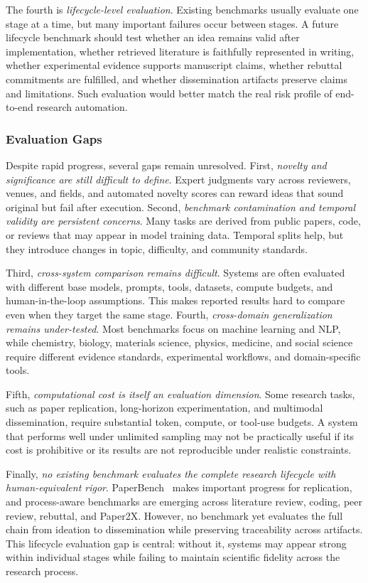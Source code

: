 \documentclass{llmxive}
\begin{document}
The fourth is \emph{lifecycle-level evaluation}. Existing benchmarks usually evaluate one stage at a time, but many important failures occur between stages. A future lifecycle benchmark should test whether an idea remains valid after implementation, whether retrieved literature is faithfully represented in writing, whether experimental evidence supports manuscript claims, whether rebuttal commitments are fulfilled, and whether dissemination artifacts preserve claims and limitations. Such evaluation would better match the real risk profile of end-to-end research automation.


\subsubsection{Evaluation Gaps}
\label{sec:eval_challenges}

Despite rapid progress, several gaps remain unresolved. First, \emph{novelty and significance are still difficult to define}. Expert judgments vary across reviewers, venues, and fields, and automated novelty scores can reward ideas that sound original but fail after execution. Second, \emph{benchmark contamination and temporal validity are persistent concerns}. Many tasks are derived from public papers, code, or reviews that may appear in model training data. Temporal splits help, but they introduce changes in topic, difficulty, and community standards.

Third, \emph{cross-system comparison remains difficult}. Systems are often evaluated with different base models, prompts, tools, datasets, compute budgets, and human-in-the-loop assumptions. This makes reported results hard to compare even when they target the same stage. Fourth, \emph{cross-domain generalization remains under-tested}. Most benchmarks focus on machine learning and NLP, while chemistry, biology, materials science, physics, medicine, and social science require different evidence standards, experimental workflows, and domain-specific tools.

Fifth, \emph{computational cost is itself an evaluation dimension}. Some research tasks, such as paper replication, long-horizon experimentation, and multimodal dissemination, require substantial token, compute, or tool-use budgets. A system that performs well under unlimited sampling may not be practically useful if its cost is prohibitive or its results are not reproducible under realistic constraints.

Finally, \emph{no existing benchmark evaluates the complete research lifecycle with human-equivalent rigor}. PaperBench~\cite{paperbench2025} makes important progress for replication, and process-aware benchmarks are emerging across literature review, coding, peer review, rebuttal, and Paper2X. However, no benchmark yet evaluates the full chain from ideation to dissemination while preserving traceability across artifacts. This lifecycle evaluation gap is central: without it, systems may appear strong within individual stages while failing to maintain scientific fidelity across the research process.
\end{document}
